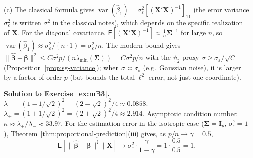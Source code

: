 \documentclass[12pt,a4paper]{article}
\theoremstyle{definition}
\newcommand\expc{\mathsf{E}}
\DeclareMathOperator\var{var}
\newcommand{\bX}{\mathbf{X}}
\def\bb{\boldsymbol{\beta}}
\newcommand{\bI}{\mathbf{I}}
\newcommand{\bSigma}{\boldsymbol{\Sigma}}
\newcommand{\hbb}{\hat{\boldsymbol{\beta}}}
\begin{document}
(c) The classical formula gives $\var(\hat\beta_1) = \sigma_\varepsilon^2[(\bX'\bX)^{-1}]_{11}$ (the error variance $\sigma_\varepsilon^2$ is written $\sigma^2$ in the classical notes), which depends on the specific realization of $\bX$. For the diagonal covariance, $\expc[(\bX'\bX)^{-1}] \approx \frac{1}{n}\bSigma^{-1}$ for large $n$, so $\var(\hat\beta_1) \approx \sigma_\varepsilon^2/(n\cdot 1) = \sigma_\varepsilon^2/n$. The modern bound gives $\|\hbb - \bb\|^2 \leqslant C\sigma^2 p/(n\lambda_{\min}(\bSigma)) = C\sigma^2 p/n$ with the $\psi_2$ proxy $\sigma \geqslant \sigma_\varepsilon/\sqrt{C}$ (Proposition~\ref{prop:sg-variance}); when $\sigma \asymp \sigma_\varepsilon$ (e.g.\ Gaussian noise), it is larger by a factor of order $p$ (but bounds the total $\ell^2$ error, not just one coordinate).

\textbf{Solution to Exercise~\ref{ex:mB3}.} $\lambda_- = (1 - 1/\sqrt{2})^2 = (2 - \sqrt{2})^2/4 \approx 0.0858$. $\lambda_+ = (1 + 1/\sqrt{2})^2 = (2 + \sqrt{2})^2/4 \approx 2.914$. Asymptotic condition number: $\kappa \approx \lambda_+/\lambda_- \approx 33.97$. For the estimation error in the isotropic case ($\bSigma = \bI_p$, $\sigma_\varepsilon^2 = 1$), Theorem~\ref{thm:proportional-prediction}(iii) gives, as $p/n \to \gamma = 0.5$,
\[
\expc[\|\hbb-\bb\|^2 \mid \bX] \to \sigma_\varepsilon^2\cdot\frac{\gamma}{1-\gamma} = 1\cdot\frac{0.5}{0.5} = 1.
\]
\end{document}
